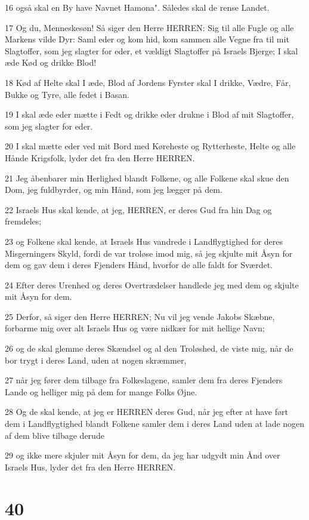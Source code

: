 \par 16 også skal en By have Navnet Hamona". Således skal de rense Landet.
\par 17 Og du, Menneskesøn! Så siger den Herre HERREN: Sig til alle Fugle og alle Markens vilde Dyr: Saml eder og kom hid, kom sammen alle Vegne fra til mit Slagtoffer, som jeg slagter for eder, et vældigt Slagtoffer på Israels Bjerge; I skal æde Kød og drikke Blod!
\par 18 Kød af Helte skal I æde, Blod af Jordens Fyrster skal I drikke, Vædre, Får, Bukke og Tyre, alle fedet i Basan.
\par 19 I skal æde eder mætte i Fedt og drikke eder drukne i Blod af mit Slagtoffer, som jeg slagter for eder.
\par 20 I skal mætte eder ved mit Bord med Køreheste og Rytterheste, Helte og alle Hånde Krigsfolk, lyder det fra den Herre HERREN.
\par 21 Jeg åbenbarer min Herlighed blandt Folkene, og alle Folkene skal skue den Dom, jeg fuldbyrder, og min Hånd, som jeg lægger på dem.
\par 22 Israels Hus skal kende, at jeg, HERREN, er deres Gud fra hin Dag og fremdeles;
\par 23 og Folkene skal kende, at Israels Hus vandrede i Landflygtighed for deres Misgerningers Skyld, fordi de var troløse imod mig, så jeg skjulte mit Åsyn for dem og gav dem i deres Fjenders Hånd, hvorfor de alle faldt for Sværdet.
\par 24 Efter deres Urenhed og deres Overtrædelser handlede jeg med dem og skjulte mit Åsyn for dem.
\par 25 Derfor, så siger den Herre HERREN; Nu vil jeg vende Jakobs Skæbne, forbarme mig over alt Israels Hus og være nidkær for mit hellige Navn;
\par 26 og de skal glemme deres Skændsel og al den Troløshed, de viste mig, når de bor trygt i deres Land, uden at nogen skræmmer,
\par 27 når jeg fører dem tilbage fra Folkeslagene, samler dem fra deres Fjenders Lande og helliger mig på dem for mange Folks Øjne.
\par 28 Og de skal kende, at jeg er HERREN deres Gud, når jeg efter at have ført dem i Landflygtighed blandt Folkene samler dem i deres Land uden at lade nogen af dem blive tilbage derude
\par 29 og ikke mere skjuler mit Åsyn for dem, da jeg har udgydt min Ånd over Israels Hus, lyder det fra den Herre HERREN.

\chapter{40}

